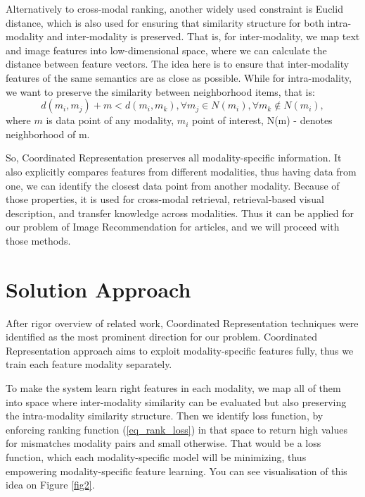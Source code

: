 \documentclass[runningheads]{llncs}
\begin{document}
Alternatively to cross-modal ranking, another widely used constraint is Euclid distance, which is also used for ensuring that similarity structure for both intra-modality and inter-modality is preserved. That is, for inter-modality, we map text and image features into low-dimensional space, where we can calculate the distance between feature vectors. The idea here is to ensure that inter-modality features of the same semantics are as close as possible\cite{ref_pan}. While for intra-modality, we want to preserve the similarity between neighborhood items, that is:
$$ d(m_i, m_j) + m < d(m_i, m_k), \forall m_j \in N(m_i), \forall m_k \notin N(m_i),$$
where $m$ is data point of any modality, $m_i$ point of interest, N(m) - denotes neighborhood of m\cite{ref_wang}.

So, Coordinated Representation preserves all modality-specific information. It also explicitly compares features from different modalities, thus having data from one, we can identify the closest data point from another modality. Because of those properties, it is used for cross-modal retrieval\cite{ref_wang}, retrieval-based visual description\cite{ref_socher}, and transfer knowledge across modalities\cite{ref_pan}. Thus it can be applied for our problem of Image Recommendation for articles, and we will proceed with those methods.


\section{Solution Approach}
After rigor overview of related work, Coordinated Representation techniques were identified as the most prominent direction for our problem. Coordinated Representation approach aims to exploit modality-specific features fully, thus we train each feature modality separately.

To make the system learn right features in each modality, we map all of them into space where inter-modality similarity can be evaluated but also preserving the intra-modality similarity structure\cite{ref_cross_modal_hash}\cite{ref_devise}\cite{ref_kiros}. Then we identify loss function, by enforcing ranking function (\ref{eq_rank_loss}) in that space to return high values for mismatches modality pairs and small otherwise. That would be a loss function, which each modality-specific model will be minimizing, thus empowering modality-specific feature learning. You can see visualisation of this idea on Figure \ref{fig2}.
\end{document}

